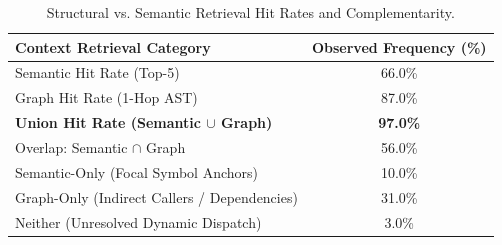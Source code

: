 \begin{table}[t]
\centering
\small
\caption{Structural vs. Semantic Retrieval Hit Rates and Complementarity.}
\label{tab:relevance}
\begin{tabular}{lc}
\toprule
\textbf{Context Retrieval Category} & \textbf{Observed Frequency (\%)} \\
\midrule
Semantic Hit Rate (Top-5) & 66.0\% \\
Graph Hit Rate (1-Hop AST) & 87.0\% \\
\textbf{Union Hit Rate (Semantic $\cup$ Graph)} & \textbf{97.0\%} \\
\midrule
Overlap: Semantic $\cap$ Graph & 56.0\% \\
Semantic-Only (Focal Symbol Anchors) & 10.0\% \\
Graph-Only (Indirect Callers / Dependencies) & 31.0\% \\
Neither (Unresolved Dynamic Dispatch) & 3.0\% \\
\bottomrule
\end{tabular}
\end{table}